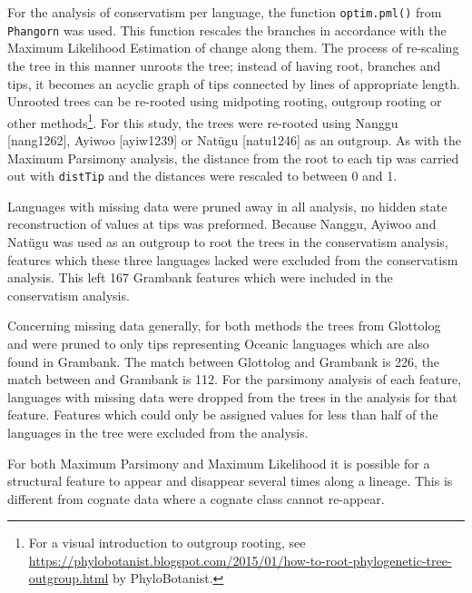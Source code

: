 \documentclass[draft,10pt]{article} %
\begin{document}
For the analysis of conservatism per language, the function \texttt{optim.pml()} from \texttt{Phangorn} \citep{phangorn} was used. This function rescales the branches in accordance with the Maximum Likelihood Estimation of change along them. The process of re-scaling the tree in this manner unroots the tree; instead of having root, branches and tips, it becomes an acyclic graph of tips connected by lines of appropriate length. Unrooted trees can be re-rooted using midpoting rooting, outgroup rooting or other methods\footnote{For a visual introduction to outgroup rooting, see \href{this blogpost}{https://phylobotanist.blogspot.com/2015/01/how-to-root-phylogenetic-tree-outgroup.html} by PhyloBotanist.}. For this study, the trees were re-rooted using Nanggu [nang1262], Ayiwoo [ayiw1239] or Natügu [natu1246] as an outgroup. As with the Maximum Parsimony analysis, the distance from the root to each tip was carried out with \texttt{distTip} and the distances were rescaled to between 0 and 1. 

Languages with missing data were pruned away in all analysis, no hidden state reconstruction of values at tips was preformed. Because Nanggu, Ayiwoo and Natügu was used as an outgroup to root the trees in the conservatism analysis, features which these three languages lacked were excluded from the conservatism analysis. This left 167 Grambank features which were included in the conservatism analysis. %

Concerning missing data generally, for both methods the trees from Glottolog and \citet{grayetal_2009} were pruned to only tips representing Oceanic languages which are also found in Grambank. The match between Glottolog and Grambank is 226, the match between \citet{grayetal_2009} and Grambank is 112. For the parsimony analysis of each feature, languages with missing data were dropped from the trees in the analysis for that feature. Features which could only be assigned values for less than half of the languages in the tree were excluded from the analysis.

For both Maximum Parsimony and Maximum Likelihood it is possible for a structural feature to appear and disappear several times along a lineage. This is different from cognate data where a cognate class cannot re-appear.
\end{document}
